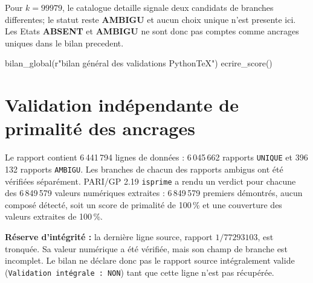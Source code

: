 \documentclass[11pt,a4paper]{article}
\begin{document}
Pour $k=99979$, le catalogue detaille signale deux candidats de branches differentes;
le statut reste \textbf{AMBIGU} et aucun choix unique n'est presente ici. Les Etats
\textbf{ABSENT} et \textbf{AMBIGU} ne sont donc pas comptes comme ancrages uniques dans
le bilan precedent.

\begin{pycode}
bilan_global(r"bilan général des validations PythonTeX")
ecrire_score()
\end{pycode}

\ifdefined\pytxok\else
{}
\fi

\clearpage
\section*{Validation indépendante de primalité des ancrages}

\begin{boiteformule}[Bilan de la reconstruction $k=28\,000\,000$ à $84\,000\,000$]
Le rapport contient 6\,441\,794 lignes de données : 6\,045\,662 rapports
\texttt{UNIQUE} et 396\,132 rapports \texttt{AMBIGU}. Les branches de chacun
des rapports ambigus ont été vérifiées séparément. PARI/GP 2.19
\texttt{isprime} a rendu un verdict pour chacune des 6\,849\,579 valeurs
numériques extraites : 6\,849\,579 premiers démontrés, aucun composé détecté,
soit un score de primalité de 100\,\% et une couverture des valeurs extraites
de 100\,\%.

\textbf{Réserve d'intégrité :} la dernière ligne source, rapport $1/77293103$,
est tronquée. Sa valeur numérique a été vérifiée, mais son champ de branche
est incomplet. Le bilan ne déclare donc pas le rapport source intégralement
valide (\texttt{Validation intégrale : NON}) tant que cette ligne n'est pas
récupérée.
\end{boiteformule}
\end{document}
